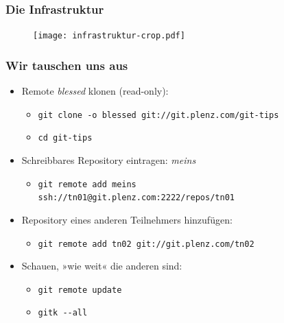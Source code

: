 \documentclass{beamer}
\begin{document}
\begin{frame}
 \frametitle{Die Infrastruktur}
  


\begin{figure}
\texttt{[image: infrastruktur-crop.pdf]}
\end{figure}

  
 \end{frame}
\begin{frame}
 \frametitle{Wir tauschen uns aus}
  


\begin{itemize}
  \item Remote \emph{blessed} klonen (read-only):
\begin{itemize}
  \item \texttt{git clone -o blessed git://git.plenz.com/git-tips}
  \item \texttt{cd git-tips}
\end{itemize}
\end{itemize}

\vspace{.2cm}

\begin{itemize}
  \item Schreibbares Repository eintragen: \emph{meins}
\begin{itemize}
  \item \parbox[t]{9cm}{\texttt{git remote add meins}\\\texttt{\hspace*{1cm}ssh://tn01@git.plenz.com:2222/repos/tn01}}
\end{itemize}
\end{itemize}

\vspace{.2cm}

\begin{itemize}
  \item Repository eines anderen Teilnehmers hinzufügen:
\begin{itemize}
  \item \texttt{git remote add tn02 git://git.plenz.com/tn02}
\end{itemize}
\end{itemize}

\vspace{.2cm}

\begin{itemize}
  \item Schauen, »wie weit« die anderen sind:
\begin{itemize}
  \item \texttt{git remote update}
  \item \texttt{gitk -{}-all}
\end{itemize}
\end{itemize}

  
 \end{frame}
\end{document}
